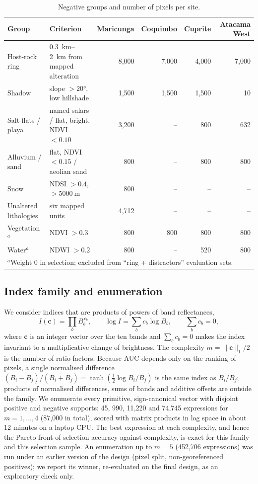 \documentclass[pdflatex,sn-basic]{sn-jnl}
\begin{document}
\begin{table}[ht]
\centering
\caption{Negative groups and number of pixels per site.}
\label{tab:negatives}
\small
\footnotesize\setlength{\tabcolsep}{3pt}
\begin{tabular}{lp{3.2cm}rrrr}
\toprule
Group & Criterion & Maricunga & Coquimbo & Cuprite & Atacama West \\
\midrule
Host-rock ring & \SIrange{0.3}{2}{\kilo\meter} from mapped alteration & 8{,}000 & 7{,}000 & 4{,}000 & 7{,}000 \\
Shadow & slope $>\ang{20}$, low hillshade & 1{,}500 & 1{,}500 & 1{,}500 & 10 \\
Salt flats / playa & named salars / flat, bright, NDVI $<0.10$ & 3{,}200 & -- & 800 & 632 \\
Alluvium / sand & flat, NDVI $<0.15$ / aeolian sand & 800 & -- & 800 & 800 \\
Snow & NDSI $>0.4$, $>\SI{5000}{\meter}$ & 800 & -- & -- & -- \\
Unaltered lithologies & six mapped units & 4{,}712 & -- & -- & -- \\
Vegetation$^{a}$ & NDVI $>0.3$ & 800 & 800 & 800 & 800 \\
Water$^{a}$ & NDWI $>0.2$ & 800 & -- & 520 & 800 \\
\bottomrule
\multicolumn{6}{l}{\footnotesize $^{a}$Weight 0 in selection; excluded from ``ring + distractors'' evaluation sets.}
\end{tabular}
\end{table}

\subsection{Index family and enumeration}
\label{sec:enumeration}

We consider indices that are products of powers of band reflectances,
\begin{equation}
I(\mathbf{c}) = \prod_{b} B_b^{\,c_b}, \qquad \log I = \sum_{b} c_b \log B_b, \qquad \sum_b c_b = 0,
\label{eq:family}
\end{equation}
where $\mathbf{c}$ is an integer vector over the ten bands and $\sum_b c_b = 0$ makes the index invariant to a multiplicative change of brightness. The complexity $m = \lVert \mathbf{c} \rVert_1 / 2$ is the number of ratio factors. Because AUC depends only on the ranking of pixels, a single normalised difference $(B_i - B_j)/(B_i + B_j) = \tanh(\tfrac{1}{2}\log B_i/B_j)$ is the same index as $B_i/B_j$; products of normalised differences, sums of bands and additive offsets are outside the family. We enumerate every primitive, sign-canonical vector with disjoint positive and negative supports: 45, 990, 11{,}220 and 74{,}745 expressions for $m = 1, \dots, 4$ (87{,}000 in total), scored with matrix products in log space in about 12 minutes on a laptop CPU. The best expression at each complexity, and hence the Pareto front of selection accuracy against complexity, is exact for this family and this selection sample. An enumeration up to $m = 5$ (452{,}706 expressions) was run under an earlier version of the design (pixel split, non-georeferenced positives); we report its winner, re-evaluated on the final design, as an exploratory check only.
\end{document}
